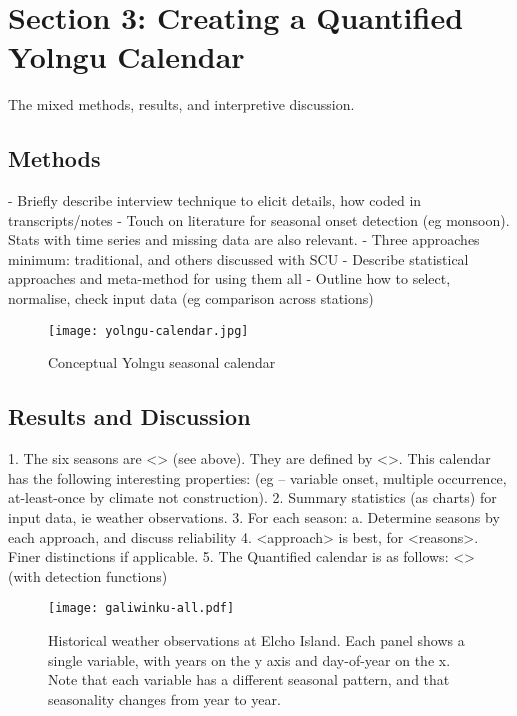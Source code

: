 \chapter{Section 3:  Creating a Quantified Yolngu Calendar}
The mixed methods, results, and interpretive discussion.

\section{Methods}
-	Briefly describe interview technique to elicit details, how coded in transcripts/notes
-	Touch on literature for seasonal onset detection (eg monsoon).  Stats with time series and missing data are also relevant.
-	Three approaches minimum:  traditional, and others discussed with SCU
-	Describe statistical approaches and meta-method for using them all
-	Outline how to select, normalise, check input data (eg comparison across stations)

\begin{figure}[h]
    \centering
    \texttt{[image: yolngu-calendar.jpg]}
    \caption{Conceptual Yolngu seasonal calendar \citep{davis1989}}
    \label{fig:yolngu-seasons}
\end{figure}

\section{Results and Discussion}
1.	The six seasons are <> (see above).  They are defined by <>.  This calendar has the following interesting properties:  (eg – variable onset, multiple occurrence, at-least-once by climate not construction).
2.	Summary statistics (as charts) for input data, ie weather observations.
3.	For each season:
a.	Determine seasons by each approach, and discuss reliability
4.	<approach> is best, for <reasons>.  Finer distinctions if applicable.
5.	The Quantified calendar is as follows:  <> (with detection functions)

\begin{figure}[h]
    \centering
    \texttt{[image: galiwinku-all.pdf]}
    \caption[Historical weather observations at Elcho Island]{
        Historical weather observations at Elcho Island.  Each panel shows a single variable, with years on the y axis and day-of-year on the x.
        Note that each variable has a different seasonal pattern, and that seasonality changes from year to year.}
    \label{fig:observation-panels}
\end{figure}

\begin{landscape}
\begin{table}

\end{table}
\end{landscape}

